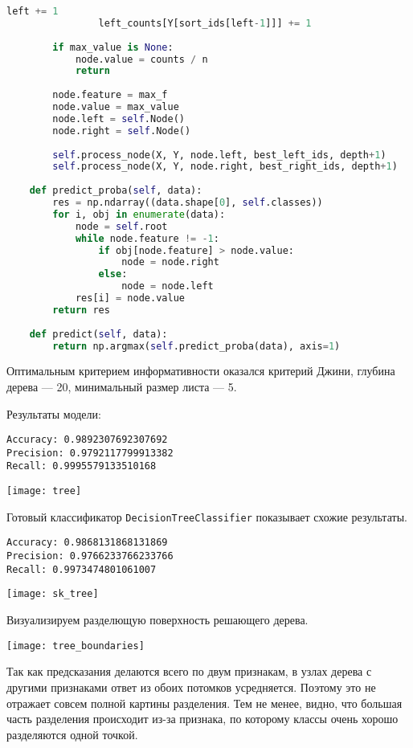 \begin{lstlisting}[language=python, keepspaces=true]
                left += 1
                left_counts[Y[sort_ids[left-1]]] += 1
        
        if max_value is None:
            node.value = counts / n
            return
        
        node.feature = max_f
        node.value = max_value
        node.left = self.Node()
        node.right = self.Node()
        
        self.process_node(X, Y, node.left, best_left_ids, depth+1)
        self.process_node(X, Y, node.right, best_right_ids, depth+1)
        
    def predict_proba(self, data):
        res = np.ndarray((data.shape[0], self.classes))
        for i, obj in enumerate(data):
            node = self.root
            while node.feature != -1:
                if obj[node.feature] > node.value:
                    node = node.right
                else:
                    node = node.left
            res[i] = node.value
        return res
    
    def predict(self, data):
        return np.argmax(self.predict_proba(data), axis=1)
\end{lstlisting}
\pagebreak

Оптимальным критерием информативности оказался критерий Джини, глубина дерева --- 20, минимальный размер листа --- 5.

Результаты модели:
\begin{lstlisting}[frame=none, numbers=none]
Accuracy: 0.9892307692307692
Precision: 0.9792117799913382
Recall: 0.9995579133510168
\end{lstlisting}
\begin{center}
\texttt{[image: tree]}
\end{center}

Готовый классификатор \texttt{DecisionTreeClassifier} показывает схожие результаты.
\begin{lstlisting}[frame=none, numbers=none]
Accuracy: 0.9868131868131869
Precision: 0.9766233766233766
Recall: 0.9973474801061007
\end{lstlisting}
\begin{center}
\texttt{[image: sk\_tree]}
\end{center}
\pagebreak

Визуализируем разделющую поверхность решающего дерева.

\texttt{[image: tree\_boundaries]}

Так как предсказания делаются всего по двум признакам, в узлах дерева с другими признаками ответ из обоих потомков усредняется. Поэтому это не отражает совсем полной картины разделения. Тем не менее, видно, что большая часть разделения происходит из-за признака, по которому классы очень хорошо разделяются одной точкой.
\pagebreak

